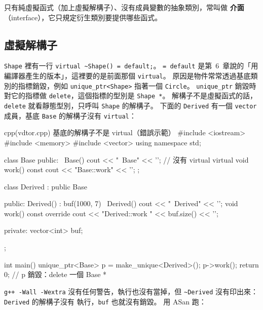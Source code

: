只有純虛擬函式（加上虛擬解構子）、沒有成員變數的抽象類別，常叫做
\textbf{介面}（interface），它只規定衍生類別要提供哪些函式。

\subsection{虛擬解構子}

\texttt{Shape} 裡有一行 \texttt{virtual \textasciitilde Shape() = default;}。
\texttt{= default} 是第~6~章說的「用編譯器產生的版本」，這裡要的是前面那個
\texttt{virtual}。 原因是物件常常透過基底類別的指標銷毀，例如
\texttt{unique\_ptr<Shape>} 指著一個 \texttt{Circle}。 \texttt{unique\_ptr}
銷毀時對它的指標做 \texttt{delete}，這個指標的型別是 \texttt{Shape *}。
解構子不是虛擬函式的話，\texttt{delete} 就看靜態型別，只呼叫
\texttt{Shape} 的解構子。 下面的 \texttt{Derived} 有一個 \texttt{vector}
成員，基底 \texttt{Base} 的解構子沒有 \texttt{virtual}：

\begin{example}[label=ex:vdtor]{cpp}{(vdtor.cpp) 基底的解構子不是 virtual（錯誤示範）}
#include <iostream>
#include <memory>
#include <vector>
using namespace std;

class Base {
public:
    ~Base() { cout << "~Base" << '\n'; }        // 沒有 virtual
    virtual void work() const { cout << "Base::work" << '\n'; }
};

class Derived : public Base {
public:
    Derived() : buf(1000, 7) {}
    ~Derived() { cout << "~Derived" << '\n'; }
    void work() const override { cout << "Derived::work " << buf.size() << '\n'; }

private:
    vector<int> buf;
};

int main() {
    unique_ptr<Base> p = make_unique<Derived>();
    p->work();
    return 0;
}                                               // p 銷毀：delete 一個 Base *
\end{example}


\texttt{g++ -Wall -Wextra} 沒有任何警告，執行也沒有當掉，但
\texttt{\textasciitilde Derived} 沒有印出來：\texttt{Derived} 的解構子沒有
執行，\texttt{buf} 也就沒有銷毀。 用 ASan 跑：


